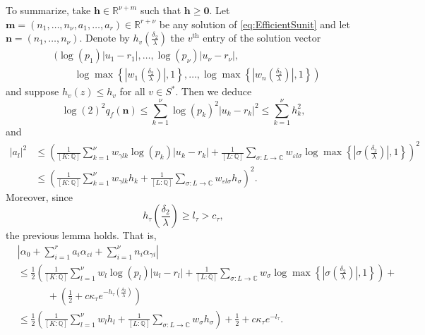 To summarize, take $\mathbf{h}\in\mathbb{R}^{\nu+m}$ such that $\mathbf{h}\geq \mathbf{0}$. Let $\mathbf{m} = (n_1, \dots, n_{\nu}, a_1, \dots, a_r) \in \mathbb{R}^{r + \nu}$ be any solution of \eqref{eq:EfficientSunit} and let $\mathbf{n} = (n_1, \dots, n_{\nu})$. Denote by $h_{v}\left(\frac{\delta_2}{\lambda}\right)$ the $v^{\text{th}}$ entry of the solution vector
\begin{align*}
&\bigg(\log(p_1)|u_1 - r_1|, \dots, \log(p_{\nu})|u_{\nu} - r_{\nu}|, \\
	& \quad \quad \left. \log \max \left\{ \left|w_1\left(\frac{\delta_2}{\lambda}\right)\right|, 1\right\}, \dots, \log \max \left\{ \left|w_n\left(\frac{\delta_2}{\lambda}\right)\right|, 1\right\}  \right)
\end{align*}
and suppose $h_v(z)\leq h_v$ for all $v\in S^*$. Then we deduce
\begin{equation} \label{def:bbound}
\log(2)^2q_f(\mathbf{n}) \leq \sum_{k = 1}^{\nu} \log(p_k)^2|u_k -r_k|^2 \leq \sum_{k = 1}^{\nu} h_k^2,
\end{equation}
and 
\begin{align}\label{def:bepsbound}
|a_l|^2 &\leq \left( \frac{1}{[K:\mathbb{Q}]}\sum_{k = 1}^{\nu} w_{\gamma l k}\log(p_k)|u_k - r_k| + \frac{1}{[L:\mathbb{Q}]}\sum_{\sigma :L \to \mathbb{C}} w_{\varepsilon l \sigma}\log \max \left\{ \left|\sigma\left(\frac{\delta_2}{\lambda}\right)\right|, 1\right\} \right)^2\\
	&\leq \left( \frac{1}{[K:\mathbb{Q}]}\sum_{k = 1}^{\nu} w_{\gamma l k}h_k + \frac{1}{[L:\mathbb{Q}]}\sum_{\sigma:L\to \mathbb{C}} w_{\varepsilon l \sigma}h_{\sigma}\right)^2.
\end{align}
Moreover, since
\[h_{\tau}\left(\frac{\delta_2}{\lambda}\right) \geq l_{\tau} > c_{\tau},\]
the previous lemma holds. That is, 
\begin{align*}
&\left|\alpha_0+\sum_{i = 1}^r a_i \alpha_{\varepsilon i} + \sum_{i = 1}^{\nu} n_i \alpha_{\gamma i}\right|\\
	& \leq \frac{1}{2}\left(\frac{1}{[K:\mathbb{Q}]}\sum_{l = 1}^{\nu}w_l \log(p_l)|u_l - r_l| + \frac{1}{[L:\mathbb{Q}]}\sum_{\sigma :L \to \mathbb{C}} w_{\sigma}\log \max \left\{ \left|\sigma\left(\frac{\delta_2}{\lambda}\right)\right|, 1\right\} \right) + \\
	& \quad \quad \quad + \left(\frac{1}{2} + c\kappa_{\tau}e^{-h_{\tau}\left(\frac{\delta_2}{\lambda}\right)}\right)\\
	& \leq \frac{1}{2}\left(\frac{1}{[K:\mathbb{Q}]}\sum_{l = 1}^{\nu}w_l h_l + \frac{1}{[L:\mathbb{Q}]}\sum_{\sigma :L \to \mathbb{C}} w_{\sigma}h_{\sigma} \right) + \frac{1}{2} + c\kappa_{\tau}e^{-l_{\tau}}.
\end{align*} 
